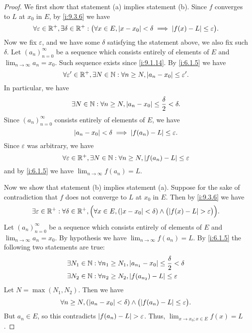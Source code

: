 \begin{proof}
  We first show that statement (a) implies statement (b).
  Since \(f\) converges to \(L\) at \(x_0\) in \(E\), by \cref{i:9.3.6} we have
  \[
    \forall \varepsilon \in \mathbb{R}^+, \exists \delta \in \mathbb{R}^+ : \big(\forall x \in E, \left\lvert x - x_0\right\rvert < \delta \implies \left\lvert f(x) - L\right\rvert \leq \varepsilon\big).
  \]
  Now we fix \(\varepsilon\), and we have some \(\delta\) satisfying the statement above, we also fix such \(\delta\).
  Let \((a_n)_{n = 0}^\infty\) be a sequence which consists entirely of elements of \(E\) and \(\lim_{n \to \infty} a_n = x_0\).
  Such sequence exists since \cref{i:9.1.14}.
  By \cref{i:6.1.5} we have
  \[
    \forall \varepsilon' \in \mathbb{R}^+, \exists N \in \mathbb{N} : \forall n \geq N, \left\lvert a_n - x_0\right\rvert \leq \varepsilon'.
  \]
  In particular, we have
  \[
    \exists N \in \mathbb{N} : \forall n \geq N, \left\lvert a_n - x_0\right\rvert \leq \dfrac{\delta}{2} < \delta.
  \]
  Since \((a_n)_{n = 0}^\infty\) consists entirely of elements of \(E\), we have
  \[
    \left\lvert a_n - x_0\right\rvert < \delta \implies \left\lvert f(a_n) - L\right\rvert \leq \varepsilon.
  \]
  Since \(\varepsilon\) was arbitrary, we have
  \[
    \forall \varepsilon \in \mathbb{R}^+, \exists N \in \mathbb{N} : \forall n \geq N, \left\lvert f(a_n) - L\right\rvert \leq \varepsilon
  \]
  and by \cref{i:6.1.5} we have \(\lim_{n \to \infty} f(a_n) = L\).

  Now we show that statement (b) implies statement (a).
  Suppose for the sake of contradiction that \(f\) does not converge to \(L\) at \(x_0\) in \(E\).
  Then by \cref{i:9.3.6} we have
  \[
    \exists \varepsilon \in \R^+ : \forall \delta \in \R^+, \Big(\forall x \in E, (\abs{x - x_0} < \delta) \land \big(\abs{f(x) - L} > \varepsilon\big)\Big).
  \]
  Let \((a_n)_{n = 0}^\infty\) be a sequence which consists entirely of elements of \(E\) and \(\lim_{n \to \infty} a_n = x_0\).
  By hypothesis we have \(\lim_{n \to \infty} f(a_n) = L\).
  By \cref{i:6.1.5} the following two statements are true:
  \begin{align*}
     & \exists N_1 \in \mathbb{N} : \forall n_1 \geq N_1, \left\lvert a_{n_1} - x_0\right\rvert \leq \dfrac{\delta}{2} < \delta \\
     & \exists N_2 \in \mathbb{N} : \forall n_2 \geq N_2, \left\lvert f(a_{n_2}) - L\right\rvert \leq \varepsilon
  \end{align*}
  Let \(N = \max(N_1, N_2)\).
  Then we have
  \[
    \forall n \geq N, (\abs{a_n - x_0} < \delta) \land \big(\abs{f(a_n) - L} \leq \varepsilon\big).
  \]
  But \(a_n \in E\), so this contradicts \(\left\lvert f(a_n) - L\right\rvert > \varepsilon\).
  Thus, \(\lim_{x \to x_0 ; x \in E} f(x) = L\).
\end{proof}

